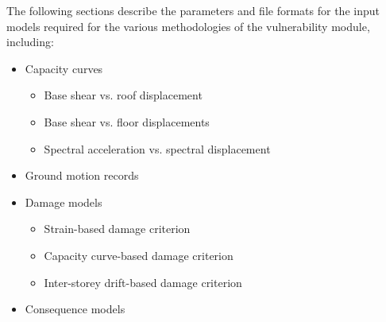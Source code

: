 The following sections describe the parameters and file formats for the input models required for the various methodologies of the vulnerability module, including:

\begin{itemize}
  \item Capacity curves
  \begin{itemize}
  	\item Base shear vs. roof displacement
  	\item Base shear vs. floor displacements
  	\item Spectral acceleration vs. spectral displacement
  \end{itemize}
  \item Ground motion records
  \item Damage models
  \begin{itemize}
  	\item Strain-based damage criterion
  	\item Capacity curve-based damage criterion
  	\item Inter-storey drift-based damage criterion
  \end{itemize}
  \item Consequence models
\end{itemize}